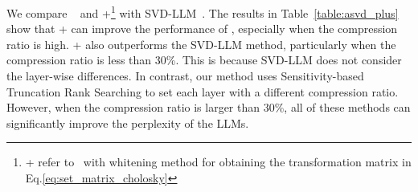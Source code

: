 We compare \asvd~ and \asvd+\footnote{\asvd+ refer to \asvd~with whitening method for obtaining the transformation matrix in Eq.\ref{eq:set_matrix_cholosky}} with SVD-LLM~\citep{wang2024svdllm}. 
The results in Table~\ref{table:asvd_plus} show that \asvd+ can improve the performance of \asvd, especially when the compression ratio is high.
\asvd+ also outperforms the SVD-LLM method, particularly when the compression ratio is less than 30\%. 
This is because SVD-LLM does not consider the layer-wise differences. In contrast, our method uses Sensitivity-based Truncation Rank Searching to set each layer with a different compression ratio. 
However, when the compression ratio is larger than 30\%, all of these methods can significantly improve the perplexity of the LLMs.

